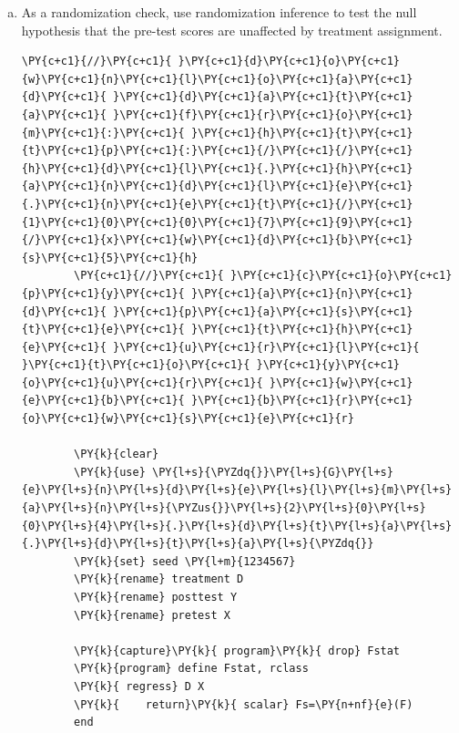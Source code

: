 \documentclass[11pt,notitlepage]{article}\usepackage[]{graphicx}\usepackage[]{color}
\makeatletter
\newenvironment{kframe}{%
 \def\at@end@of@kframe{}%
 \ifinner\ifhmode%
  \def\at@end@of@kframe{\end{minipage}}%
  \begin{minipage}{\columnwidth}%
 \fi\fi%
 \def\FrameCommand##1{\hskip\@totalleftmargin \hskip-\fboxsep
 \colorbox{shadecolor}{##1}\hskip-\fboxsep
     \hskip-\linewidth \hskip-\@totalleftmargin \hskip\columnwidth}%
 \MakeFramed {\advance\hsize-\width
   \@totalleftmargin\z@ \linewidth\hsize
   \@setminipage}}%
 {\par\unskip\endMakeFramed%
 \at@end@of@kframe}
\newenvironment{knitrout}{}{} %
\makeatother
\begin{document}
\begin{enumerate}[a)]
\item As a randomization check, use randomization inference to test the null hypothesis that the pre-test scores are unaffected by treatment assignment.

\begin{knitrout}
\color{fgcolor}\begin{kframe}
 \begin{Verbatim}[commandchars=\\\{\}]
	\PY{c+c1}{//}\PY{c+c1}{ }\PY{c+c1}{d}\PY{c+c1}{o}\PY{c+c1}{w}\PY{c+c1}{n}\PY{c+c1}{l}\PY{c+c1}{o}\PY{c+c1}{a}\PY{c+c1}{d}\PY{c+c1}{ }\PY{c+c1}{d}\PY{c+c1}{a}\PY{c+c1}{t}\PY{c+c1}{a}\PY{c+c1}{ }\PY{c+c1}{f}\PY{c+c1}{r}\PY{c+c1}{o}\PY{c+c1}{m}\PY{c+c1}{:}\PY{c+c1}{ }\PY{c+c1}{h}\PY{c+c1}{t}\PY{c+c1}{t}\PY{c+c1}{p}\PY{c+c1}{:}\PY{c+c1}{/}\PY{c+c1}{/}\PY{c+c1}{h}\PY{c+c1}{d}\PY{c+c1}{l}\PY{c+c1}{.}\PY{c+c1}{h}\PY{c+c1}{a}\PY{c+c1}{n}\PY{c+c1}{d}\PY{c+c1}{l}\PY{c+c1}{e}\PY{c+c1}{.}\PY{c+c1}{n}\PY{c+c1}{e}\PY{c+c1}{t}\PY{c+c1}{/}\PY{c+c1}{1}\PY{c+c1}{0}\PY{c+c1}{0}\PY{c+c1}{7}\PY{c+c1}{9}\PY{c+c1}{/}\PY{c+c1}{x}\PY{c+c1}{w}\PY{c+c1}{d}\PY{c+c1}{b}\PY{c+c1}{s}\PY{c+c1}{5}\PY{c+c1}{h}
        \PY{c+c1}{//}\PY{c+c1}{ }\PY{c+c1}{c}\PY{c+c1}{o}\PY{c+c1}{p}\PY{c+c1}{y}\PY{c+c1}{ }\PY{c+c1}{a}\PY{c+c1}{n}\PY{c+c1}{d}\PY{c+c1}{ }\PY{c+c1}{p}\PY{c+c1}{a}\PY{c+c1}{s}\PY{c+c1}{t}\PY{c+c1}{e}\PY{c+c1}{ }\PY{c+c1}{t}\PY{c+c1}{h}\PY{c+c1}{e}\PY{c+c1}{ }\PY{c+c1}{u}\PY{c+c1}{r}\PY{c+c1}{l}\PY{c+c1}{ }\PY{c+c1}{t}\PY{c+c1}{o}\PY{c+c1}{ }\PY{c+c1}{y}\PY{c+c1}{o}\PY{c+c1}{u}\PY{c+c1}{r}\PY{c+c1}{ }\PY{c+c1}{w}\PY{c+c1}{e}\PY{c+c1}{b}\PY{c+c1}{ }\PY{c+c1}{b}\PY{c+c1}{r}\PY{c+c1}{o}\PY{c+c1}{w}\PY{c+c1}{s}\PY{c+c1}{e}\PY{c+c1}{r}
        
        \PY{k}{clear}
        \PY{k}{use} \PY{l+s}{\PYZdq{}}\PY{l+s}{G}\PY{l+s}{e}\PY{l+s}{n}\PY{l+s}{d}\PY{l+s}{e}\PY{l+s}{l}\PY{l+s}{m}\PY{l+s}{a}\PY{l+s}{n}\PY{l+s}{\PYZus{}}\PY{l+s}{2}\PY{l+s}{0}\PY{l+s}{0}\PY{l+s}{4}\PY{l+s}{.}\PY{l+s}{d}\PY{l+s}{t}\PY{l+s}{a}\PY{l+s}{.}\PY{l+s}{d}\PY{l+s}{t}\PY{l+s}{a}\PY{l+s}{\PYZdq{}}
        \PY{k}{set} seed \PY{l+m}{1234567}
        \PY{k}{rename} treatment D
        \PY{k}{rename} posttest Y
        \PY{k}{rename} pretest X
        
        \PY{k}{capture}\PY{k}{ program}\PY{k}{ drop} Fstat
        \PY{k}{program} define Fstat, rclass
        \PY{k}{	regress} D X
        \PY{k}{    return}\PY{k}{ scalar} Fs=\PY{n+nf}{e}(F)
        end
        

\end{Verbatim}
\end{kframe}
\end{knitrout}
\end{enumerate}
\end{document}
